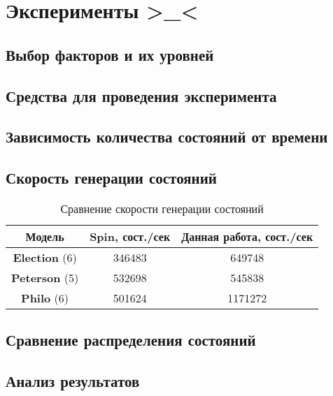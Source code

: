 \chapter{Эксперименты >\_<}
\label{cha:experim}

\section{Выбор факторов и их уровней}
\label{sec:experim-strategy}

\section{Средства для проведения эксперимента}
\label{sec:experim-idef0}

\section{Зависимость количества состояний от времени}
\label{sec:space-time}

\section{Скорость генерации состояний}
\label{sec:stategen-speed}

\begin{table}[ht]
  \centering
  \caption{Сравнение скорости генерации состояний}
  \begin{tabular}{ccc}
    \hline
    Модель & Spin, сост./сек & Данная работа, сост./сек \\
    \hline
    \textbf{Election} (6) & 346483 & 649748 \\
    \textbf{Peterson} (5) & 532698 & 545838 \\
    \textbf{Philo} (6) & 501624 & 1171272 \\
    \hline
  \end{tabular}
  \label{tab:stategen-speed}
\end{table}

\section{Сравнение распределения состояний}
\label{sec:partition-cmp}

\section{Анализ результатов}
\label{sec:exp-analysis}

